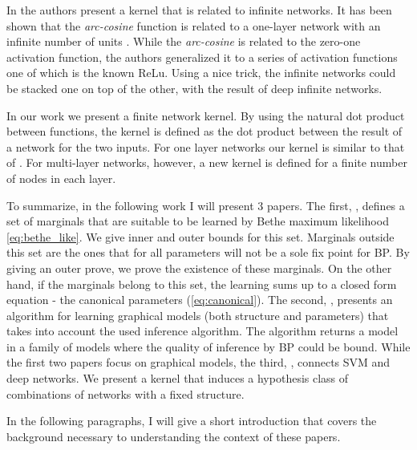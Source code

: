 In \cite{cho2009kernel} the authors present a kernel that is related to infinite networks.
It has been shown that the \textit{arc-cosine} function is related to a one-layer network with an infinite number of units \cite{williams1998computation}.
While the \textit{arc-cosine} is related to the zero-one activation function, the authors generalized it to a series of activation functions one of which is the known ReLu.
Using a nice trick, the infinite networks could be stacked one on top of the other, with the result of deep infinite networks.

In our work \cite{heinemann2016improper} we present a finite network kernel.
By using the natural dot product between functions, the kernel is defined as the dot product between the result of a network for the two inputs.
For one layer networks our kernel is similar to that of \cite{cho2009kernel}.
For multi-layer networks, however, a new kernel is defined for a finite number of nodes in each layer.

To summarize, in the following work I will present $3$ papers.
The first, \cite{heinemann2012cannot}, defines a set of marginals that are suitable to be learned by Bethe maximum likelihood \eqref{eq:bethe_like}.
We give inner and outer bounds for this set.
Marginals outside this set are the ones that for all parameters will not be a sole fix point for BP.
By giving an outer prove, we prove the existence of these marginals.
On the other hand, if the marginals belong to this set, the learning sums up to a closed form equation - the canonical parameters (\eqref{eq:canonical}).
The second, \cite{heinemann2014inferning}, presents an algorithm for learning graphical models (both structure and parameters) that takes into account the used inference algorithm.
The algorithm returns a model in a family of models where the quality of inference by BP could be bound.
While the first two papers focus on graphical models, the third, \cite{heinemann2016improper}, connects SVM and deep networks.
We present a kernel that induces a hypothesis class of combinations of networks with a fixed structure.

In the following paragraphs, I will give a short introduction that covers the background necessary to understanding the context of these papers.
